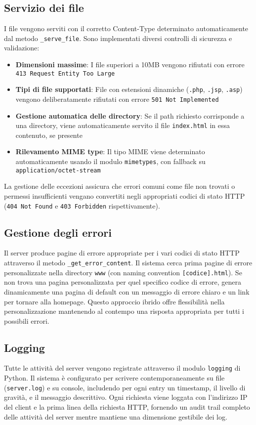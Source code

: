 \documentclass[a4paper,12pt]{report}
\begin{document}
\subsection{Servizio dei file}
I file vengono serviti con il corretto Content-Type determinato automaticamente dal metodo \texttt{\_serve\_file}. Sono implementati diversi controlli di sicurezza e validazione:
\begin{itemize}
    \item \textbf{Dimensioni massime}: I file superiori a 10MB vengono rifiutati con errore \texttt{413 Request Entity Too Large}
    \item \textbf{Tipi di file supportati}: File con estensioni dinamiche (\texttt{.php}, \texttt{.jsp}, \texttt{.asp}) vengono deliberatamente rifiutati con errore \texttt{501 Not Implemented}
    \item \textbf{Gestione automatica delle directory}: Se il path richiesto corrisponde a una directory, viene automaticamente servito il file \texttt{index.html} in essa contenuto, se presente
    \item \textbf{Rilevamento MIME type}: Il tipo MIME viene determinato automaticamente usando il modulo \texttt{mimetypes}, con fallback su \texttt{application/octet-stream}
\end{itemize}
La gestione delle eccezioni assicura che errori comuni come file non trovati o permessi insufficienti vengano convertiti negli appropriati codici di stato HTTP (\texttt{404 Not Found} e \texttt{403 Forbidden} rispettivamente).

\subsection{Gestione degli errori}
Il server produce pagine di errore appropriate per i vari codici di stato HTTP attraverso il metodo \texttt{\_get\_error\_content}. Il sistema cerca prima pagine di errore personalizzate nella directory \texttt{www} (con naming convention \texttt{[codice].html}). Se non trova una pagina personalizzata per quel specifico codice di errore, genera dinamicamente una pagina di default con un messaggio di errore chiaro e un link per tornare alla homepage. Questo approccio ibrido offre flessibilità nella personalizzazione mantenendo al contempo una risposta appropriata per tutti i possibili errori.

\subsection{Logging}
Tutte le attività del server vengono registrate attraverso il modulo \texttt{logging} di Python. Il sistema è configurato per scrivere contemporaneamente su file (\texttt{server.log}) e su console, includendo per ogni entry un timestamp, il livello di gravità, e il messaggio descrittivo. Ogni richiesta viene loggata con l'indirizzo IP del client e la prima linea della richiesta HTTP, fornendo un audit trail completo delle attività del server mentre mantiene una dimensione gestibile dei log.
\end{document}
